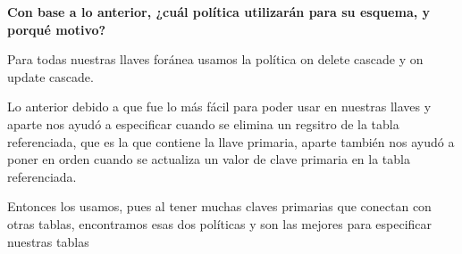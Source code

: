 \begin{center}
    \textbf{Con base a lo anterior, ¿cuál política utilizarán para su esquema, y porqué motivo?}
\end{center}

Para todas nuestras llaves foránea usamos la política on delete cascade y on update cascade.

Lo anterior debido a que fue lo más fácil para poder usar en nuestras llaves y aparte nos ayudó a especificar cuando se elimina un regsitro 
de la tabla referenciada, que es la que contiene la llave primaria, aparte también nos ayudó a poner en orden cuando se actualiza un valor 
de clave primaria en la tabla referenciada.

Entonces los usamos, pues al tener muchas claves primarias que conectan con otras tablas, encontramos esas dos políticas y son las mejores 
para especificar nuestras tablas
